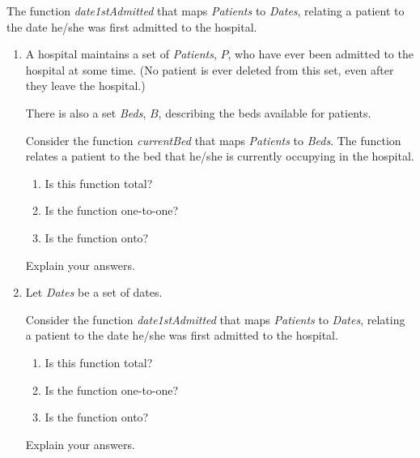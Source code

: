 		The function \textit{date1stAdmitted} that maps \textit{Patients} to \textit{Dates}, relating a patient to the date he/she was first admitted to the hospital.
        \vspace{-5pt}
   	\else
\begin{enumerate}[label=(\alph*),itemsep=0pt,parsep=3pt,topsep=0pt,partopsep=0pt]
	\item A hospital maintains a set of \textit{Patients}, $P$, who have ever been admitted to the hospital at some time. (No patient is ever deleted from this set, even after they leave the hospital.) 

	There is also a set \textit{Beds}, $B$, describing the beds available for patients. 

	Consider the function \textit{currentBed} that maps \textit{Patients} to \textit{Beds}. The function relates a patient to the bed that he/she is currently occupying in the hospital. 
	\begin{enumerate}
		\item Is this function total?
		\item Is the function one-to-one?
		\item Is the function onto?
	\end{enumerate}
	Explain your answers.

	\item Let \textit{Dates} be a set of dates. 

	Consider the function \textit{date1stAdmitted} that maps \textit{Patients} to \textit{Dates}, relating a patient to the date he/she was first admitted to the hospital.
	\begin{enumerate}
		\item Is this function total?
		\item Is the function one-to-one?
		\item Is the function onto?
	\end{enumerate}
	Explain your answers.
\end{enumerate}
	\fi	
